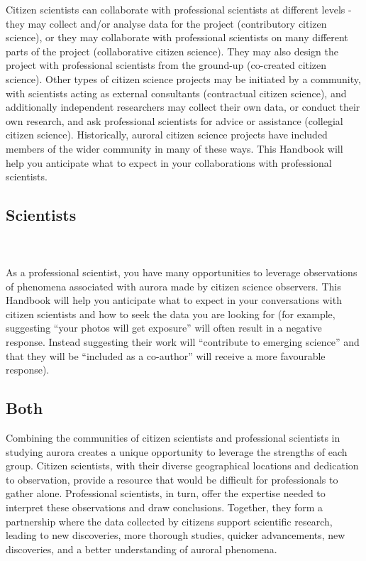 \documentclass{article}
\begin{document}
Citizen scientists can collaborate with professional scientists at different levels - they may collect and/or analyse data for the project (contributory citizen science), or they may collaborate with professional scientists on many different parts of the project (collaborative citizen science). They may also design the project with professional scientists from the ground-up (co-created citizen science). Other types of citizen science projects may be initiated by a community, with scientists acting as external consultants (contractual citizen science), and additionally independent researchers may collect their own data, or conduct their own research, and ask professional scientists for advice or assistance (collegial citizen science). Historically, auroral citizen science projects have included members of the wider community in many of these ways. This Handbook will help you anticipate what to expect in your collaborations with professional scientists.


\subsection{Scientists}
\vspace{0.5cm}
\noindent{}\\
\\

As a professional scientist, you have many opportunities to leverage observations of phenomena associated with aurora made by citizen science observers. This Handbook will help you anticipate what to expect in your conversations with citizen scientists and how to seek the data you are looking for (for example, suggesting ``your photos will get exposure'' will often result in a negative response. Instead suggesting their work will ``contribute to emerging science'' and that they will be ``included as a co-author'' will receive a more favourable response).

\subsection{Both}
Combining the communities of citizen scientists and professional scientists in studying aurora creates a unique opportunity to leverage the strengths of each group. Citizen scientists, with their diverse geographical locations and dedication to observation, provide a resource that would be difficult for professionals to gather alone. Professional scientists, in turn, offer the expertise needed to interpret these observations and draw conclusions. Together, they form a partnership where the data collected by citizens support scientific research, leading to new discoveries, more thorough studies, quicker advancements, new discoveries, and a better understanding of auroral phenomena.
\end{document}
